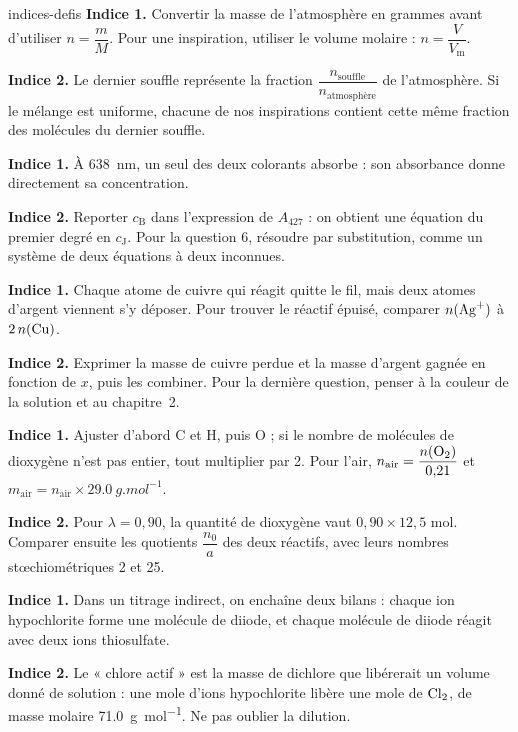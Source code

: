 \begin{blocEdition}{indices-defis}
\textbf{Indice 1.} Convertir la masse de l'atmosphère en grammes avant d'utiliser $n=\dfrac{m}{M}$. Pour une inspiration, utiliser
le volume molaire : $n=\dfrac{V}{V_\mathrm{m}}$.\par\smallskip
\textbf{Indice 2.} Le dernier souffle représente la fraction $\dfrac{n_\text{souffle}}{n_\text{atmosphère}}$ de l'atmosphère. Si le mélange est uniforme,
chacune de nos inspirations contient cette même fraction des molécules du dernier souffle.\par\smallskip
{}
\textbf{Indice 1.} À \qty{638}{nm}, un seul des deux colorants absorbe : son absorbance donne directement sa concentration.\par\smallskip
\textbf{Indice 2.} Reporter $c_\mathrm{B}$ dans l'expression de $A_{427}$ : on obtient une équation du premier degré en $c_\mathrm{J}$. Pour la
question 6, résoudre par substitution, comme un système de deux équations à deux inconnues.\par\smallskip
{}
\textbf{Indice 1.} Chaque atome de cuivre qui réagit quitte le fil, mais deux atomes d'argent viennent s'y déposer. Pour
trouver le réactif épuisé, comparer $n(\ce{Ag+})$ à $2\,n(\ce{Cu})$.\par\smallskip
\textbf{Indice 2.} Exprimer la masse de cuivre perdue et la masse d'argent gagnée en fonction de $x$, puis les combiner.
Pour la dernière question, penser à la couleur de la solution et au chapitre~2.\par\smallskip
{}
\textbf{Indice 1.} Ajuster d'abord C et H, puis O ; si le nombre de molécules de dioxygène n'est pas entier, tout
multiplier par 2. Pour l'air, $n_\text{air}=\dfrac{n(\ce{O2})}{0{,}21}$ et $m_\text{air}=n_\text{air}\times\qty{29,0}{g.mol^{-1}}$.\par\smallskip
\textbf{Indice 2.} Pour $\lambda=0{,}90$, la quantité de dioxygène vaut $0{,}90\times12{,}5$ mol. Comparer ensuite les quotients
$\dfrac{n_0}{a}$ des deux réactifs, avec leurs nombres stœchiométriques 2 et 25.\par\smallskip
{}
\textbf{Indice 1.} Dans un titrage indirect, on enchaîne deux bilans : chaque ion hypochlorite forme une molécule de diiode,
et chaque molécule de diiode réagit avec deux ions thiosulfate.\par\smallskip
\textbf{Indice 2.} Le « chlore actif » est la masse de dichlore que libérerait un volume donné de solution : une mole d'ions
hypochlorite libère une mole de $\ce{Cl2}$, de masse molaire \qty{71,0}{g.mol^{-1}}. Ne pas oublier la dilution.\par\smallskip
\end{blocEdition}

